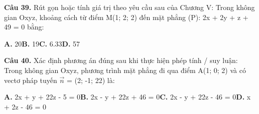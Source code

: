 \documentclass[11pt,a4paper]{article}
\begin{document}
\textbf{\color{primary} Câu 39.} Rút gọn hoặc tính giá trị theo yêu cầu sau của Chương V: Trong không gian Oxyz, khoảng cách từ điểm M(1; 2; 2) đến mặt phẳng (P): 2x + 2y + z + 49 = 0 bằng:\par
\hspace*{1.5em}\textbf{A.} 20\quad\quad \textbf{B.} 19\quad\quad \textbf{C.} 6.33\quad\quad \textbf{D.} 57\par\vspace{2pt}
\textbf{\color{primary} Câu 40.} Xác định phương án đúng sau khi thực hiện phép tính / suy luận: Trong không gian Oxyz, phương trình mặt phẳng đi qua điểm A(1; 0; 2) và có vectơ pháp tuyến $\vec{n}$ = (2; -1; 22) là:\par
\hspace*{1.5em}\textbf{A.} 2x + y + 22z - 5 = 0\quad\quad \textbf{B.} 2x - y + 22z + 46 = 0\quad\quad \textbf{C.} 2x - y + 22z - 46 = 0\quad\quad \textbf{D.} x + 2z - 46 = 0\par\vspace{2pt}
\end{document}
